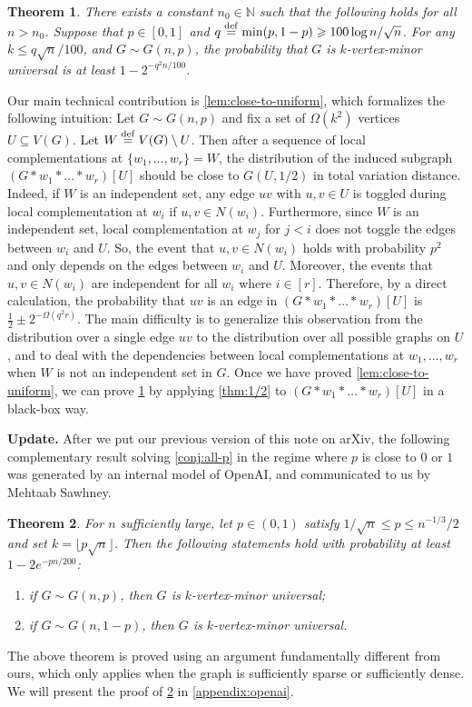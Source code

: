\documentclass[reqno]{amsart}
\newtheorem{theorem}{Theorem}
\theoremstyle{definition}
\numberwithin{theorem}{section}
\renewcommand{\leq}{\le}
\renewcommand{\geq}{\ge}
\def\eqdef{\overset{\rm{def}}{=}}
\renewcommand{\le}{\leqslant}
\renewcommand{\ge}{\geqslant}
\newcommand{\floor}[1]{\lfloor#1\rfloor}
\begin{document}
\begin{theorem}\label{thm:main}
    There exists a constant $n_0\in\mathbb{N}$ such that the following holds for all $n>n_0$.
    Suppose that $p\in[0,1]$ and $q\eqdef \min(p,1-p)\geq 100\log n/\sqrt{n}$. For any $k\leq q\sqrt{n}/100$, and $G\sim G(n,p)$, the probability that $G$ is $k$-vertex-minor universal is at least $1-2^{-q^2n/100}$.
\end{theorem}

Our main technical contribution is \cref{lem:close-to-uniform}, which formalizes the following intuition: Let $G\sim G(n,p)$ and fix a set of $\Omega(k^2)$ vertices $U\subseteq V(G)$. Let $W \eqdef V(G)\setminus U$. Then after a sequence of local complementations at $\{w_1,\dots, w_r\}= W$, the distribution of the induced subgraph $(G * w_1 * \dots * w_r)[U]$ should be close to $G(U,1/2)$ in total variation distance. Indeed, if $W$ is an independent set, any edge $uv$ with $u,v\in U$ is toggled during local complementation at $w_i$ if $u,v\in N(w_i)$. Furthermore, since $W$ is an independent set, local complementation at $w_j$ for $j < i$ does not toggle the edges between $w_i$ and $U$. So, the event that $u,v\in N(w_i)$ holds with probability $p^2$ and only depends on the edges between $w_i$ and $U$. Moreover, the events that $u,v\in N(w_i)$ are independent for all $w_i$ where $i\in [r]$. Therefore, by a direct calculation, the probability that $uv$ is an edge in $(G * w_1 * \dots * w_r)[U]$ is $\frac{1}{2}\pm 2^{-\Omega(q^2r)}$. The main difficulty is to generalize this observation from the distribution over a single edge $uv$ to the distribution over all possible graphs on $U$, and to deal with the dependencies between local complementations at $w_1,\dots,w_r$ when $W$ is not an independent set in $G$.
Once we have proved \cref{lem:close-to-uniform}, we can prove \cref{thm:main} by applying \cref{thm:1/2} to $(G * w_1 * \dots * w_r)[U]$ in a black-box way. 

\medskip \noindent\textbf{Update.} After we put our previous version of this note on arXiv, the following complementary result solving \cref{conj:all-p} in the regime where $p$ is close to $0$ or $1$ was generated by an internal model of OpenAI, and communicated to us by Mehtaab Sawhney.

\begin{theorem}\label{thm:openai}
For $n$ sufficiently large, let $p\in (0,1)$ satisfy $1/\sqrt{n}\leq p\leq n^{-1/3}/2$ and set $k = \floor{p\sqrt n}$. Then the following statements hold with probability at least $1-2e^{-pn/200}$:
\begin{enumerate}[label=(\alph*)]
    \item if $G \sim G(n,p)$, then $G$ is $k$-vertex-minor universal;\label{thm:openai_part_a}
    \item if $G \sim G(n,1-p)$, then $G$ is $k$-vertex-minor universal.\label{thm:openai_part_b}
\end{enumerate}
\end{theorem}
The above theorem is proved using an argument fundamentally different from ours, which only applies when the graph is sufficiently sparse or sufficiently dense. We will present the proof of \cref{thm:openai} in \cref{appendix:openai}.
\end{document}

